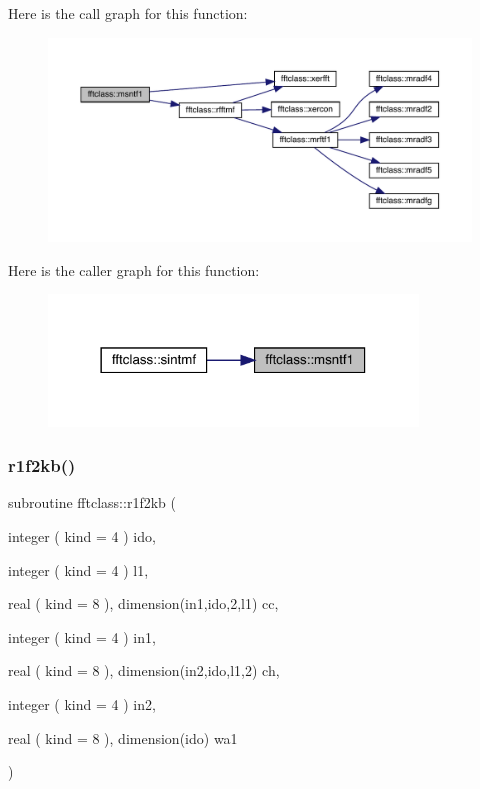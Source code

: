 Here is the call graph for this function\+:\nopagebreak
\begin{figure}[H]
\begin{center}
\leavevmode
\includegraphics[width=350pt]{namespacefftclass_a151bd1685dbe69c9c36a08ff00a7e10e_cgraph}
\end{center}
\end{figure}
Here is the caller graph for this function\+:\nopagebreak
\begin{figure}[H]
\begin{center}
\leavevmode
\includegraphics[width=278pt]{namespacefftclass_a151bd1685dbe69c9c36a08ff00a7e10e_icgraph}
\end{center}
\end{figure}
\mbox{\label{namespacefftclass_a6cf75b3c3c340adb4eb40e50289cf439}} 
\subsubsection{\texorpdfstring{r1f2kb()}{r1f2kb()}}
{\footnotesize\ttfamily subroutine fftclass\+::r1f2kb (\begin{DoxyParamCaption}\item[{integer ( kind = 4 )}]{ido,  }\item[{integer ( kind = 4 )}]{l1,  }\item[{real ( kind = 8 ), dimension(in1,ido,2,l1)}]{cc,  }\item[{integer ( kind = 4 )}]{in1,  }\item[{real ( kind = 8 ), dimension(in2,ido,l1,2)}]{ch,  }\item[{integer ( kind = 4 )}]{in2,  }\item[{real ( kind = 8 ), dimension(ido)}]{wa1 }\end{DoxyParamCaption})}

